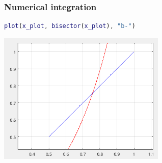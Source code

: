     \subsubsection{Numerical integration}
        \begin{lstlisting}[language=Matlab, escapeinside=`', gobble=8]
        plot(x_plot, bisector(x_plot), "b-")
        \end{lstlisting}
    
        \begin{center}
            \includegraphics[width=0.6\textwidth]{images/code_fixed_bisector2.png}            
        \end{center}
